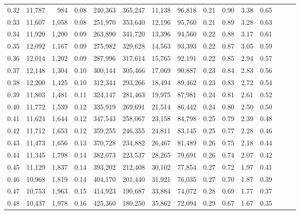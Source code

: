 \begin{tabular}{rrrrrrrrrrrrrrr}
0.32 &  11,787 &    984 &  0.08 &  240,363 &  365,247 &   11,138 &   96,818 &  0.21 &  0.90 &  3.38 &      0.65 \\
0.33 &  11,607 &  1,058 &  0.08 &  251,970 &  353,640 &   12,196 &   95,760 &  0.21 &  0.89 &  3.28 &      0.63 \\
0.34 &  11,920 &  1,200 &  0.09 &  263,890 &  341,720 &   13,396 &   94,560 &  0.22 &  0.88 &  3.17 &      0.61 \\
0.35 &  12,092 &  1,167 &  0.09 &  275,982 &  329,628 &   14,563 &   93,393 &  0.22 &  0.87 &  3.05 &      0.59 \\
0.36 &  12,014 &  1,202 &  0.09 &  287,996 &  317,614 &   15,765 &   92,191 &  0.22 &  0.85 &  2.94 &      0.57 \\
0.37 &  12,148 &  1,304 &  0.10 &  300,144 &  305,466 &   17,069 &   90,887 &  0.23 &  0.84 &  2.83 &      0.56 \\
0.38 &  12,200 &  1,425 &  0.10 &  312,344 &  293,266 &   18,494 &   89,462 &  0.23 &  0.83 &  2.72 &      0.54 \\
0.39 &  11,803 &  1,481 &  0.11 &  324,147 &  281,463 &   19,975 &   87,981 &  0.24 &  0.81 &  2.61 &      0.52 \\
0.40 &  11,772 &  1,539 &  0.12 &  335,919 &  269,691 &   21,514 &   86,442 &  0.24 &  0.80 &  2.50 &      0.50 \\
0.41 &  11,624 &  1,644 &  0.12 &  347,543 &  258,067 &   23,158 &   84,798 &  0.25 &  0.79 &  2.39 &      0.48 \\
0.42 &  11,712 &  1,653 &  0.12 &  359,255 &  246,355 &   24,811 &   83,145 &  0.25 &  0.77 &  2.28 &      0.46 \\
0.43 &  11,473 &  1,656 &  0.13 &  370,728 &  234,882 &   26,467 &   81,489 &  0.26 &  0.75 &  2.18 &      0.44 \\
0.44 &  11,345 &  1,798 &  0.14 &  382,073 &  223,537 &   28,265 &   79,691 &  0.26 &  0.74 &  2.07 &      0.42 \\
0.45 &  11,129 &  1,837 &  0.14 &  393,202 &  212,408 &   30,102 &   77,854 &  0.27 &  0.72 &  1.97 &      0.41 \\
0.46 &  10,968 &  1,819 &  0.14 &  404,170 &  201,440 &   31,921 &   76,035 &  0.27 &  0.70 &  1.87 &      0.39 \\
0.47 &  10,753 &  1,963 &  0.15 &  414,923 &  190,687 &   33,884 &   74,072 &  0.28 &  0.69 &  1.77 &      0.37 \\
0.48 &  10,437 &  1,978 &  0.16 &  425,360 &  180,250 &   35,862 &   72,094 &  0.29 &  0.67 &  1.67 &      0.35 \\

\end{tabular}
